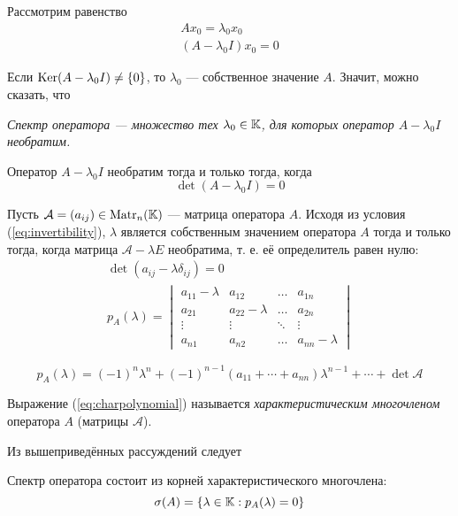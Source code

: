 Рассмотрим равенство
\vspace{-1em}
\[
    \begin{gathered}
        Ax_0 = \lambda_0 x_0 \\
        (A - \lambda_0 I)x_0 = 0 
    \end{gathered}
\]

Если $ \operatorname{Ker} (A - \lambda_0 I) \neq \left\{0\right\} $, то $\lambda_0$ — собственное значение
$A$. Значит, можно сказать, что

\emph{Спектр оператора — множество тех $\lambda_0 \in \mathbb{K}$, для которых оператор
$A - \lambda_0 I$ необратим.}

Оператор $A - \lambda_0 I$ необратим тогда и только тогда, когда 
\begin{equation} \label{eq:invertibility}
    \det (A-\lambda_0 I) = 0 
\end{equation}

Пусть $\mathcal{A} = (a_{ij}) \in \mathrm{Matr}_{n}({\mathbb{K}})$ — матрица оператора $A$. Исходя из
условия (\ref{eq:invertibility}), $\lambda$ является собственным значением
оператора $A$ тогда и только тогда, когда матрица $\mathcal{A} - \lambda E$
необратима, т. е. её определитель равен нулю:
\begin{gather} 
    \det (a_{ij} - \lambda \delta_{ij}) = 0 \nonumber \\[0.5em]
    p_A(\lambda) = \begin{vmatrix}
            a_{11} - \lambda & a_{12} & \ldots & a_{1n} \\
            a_{21} & a_{22} - \lambda & \ldots & a_{2n} \\
            \vdots & \vdots & \ddots & \vdots \\
            a_{n1} & a_{n2} & \ldots & a_{nn} - \lambda
    \end{vmatrix} \label{eq:charpolynomial}
\end{gather}

\begin{equation} \label{eq:charpolynomialexp}
    p_A(\lambda) = (-1)^{n}\lambda^n + (-1)^{n-1} (a_{11} + \dotsb +
    a_{nn}) \lambda^{n-1} + \dotsb + \det \mathcal{A}
\end{equation}

\begin{definition}
    Выражение (\ref{eq:charpolynomial}) называется \emph{характеристическим
    многочленом} оператора $A$ (матрицы $\mathcal{A}$).
\end{definition}

Из вышеприведённых рассуждений следует
\begin{theorem} \label{th:charpolynomial}
    Спектр оператора состоит из корней характеристического многочлена:
    \[ \operatorname{\sigma}(A) = \left\{\lambda \in \mathbb{K} : p_A(\lambda) = 0 \right\} \]
\end{theorem}

